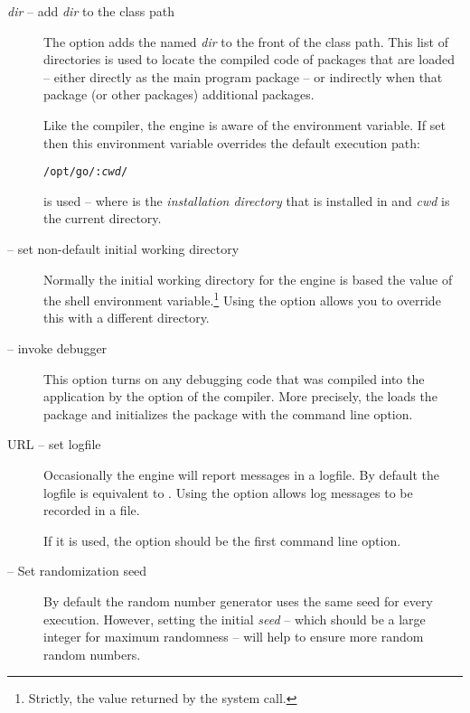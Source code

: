 \begin{description}
\item[ \emph{dir} -- add \emph{dir} to the class path]
The  option adds the named \emph{dir} to the front of the class path. This list of directories is used to locate the compiled code of packages that are loaded -- either directly as the main program package -- or indirectly when that package (or other packages)  additional packages.

Like the compiler, the \go engine is aware of the  environment variable. If set then this environment variable overrides the default execution path:
\begin{alltt}
/opt/go/:\emph{cwd}/
\end{alltt}
is used -- where  is the \emph{installation directory} that \go is installed in and \emph{cwd} is the current directory.

\item[ -- set non-default initial working directory]

Normally the initial working directory for the \go engine is based the value of the  shell environment variable.\footnote{Strictly, the value returned by the  system call.} Using the  option allows you to override this with a different directory.

\item[ -- invoke debugger]

This option turns on any debugging code that was compiled into the application by the  option of the compiler. More precisely, the \go loads the  package and initializes the package with the command line option.

\item[ URL -- set logfile]

Occasionally the \go engine will report messages in a logfile. By default the logfile is equivalent to . Using the  option allows log messages to be recorded in a file.

If it is used, the  option should be the first command line option.

\item[ -- Set randomization seed]
By default the random number generator uses the same seed for every execution. However, setting the initial \emph{seed} -- which should be a large integer for maximum randomness -- will help to ensure more random random numbers.
\end{description}